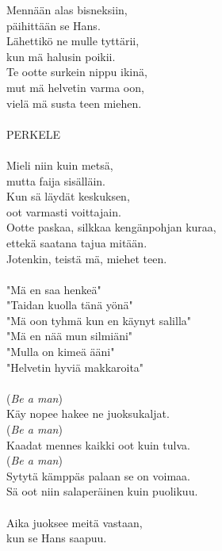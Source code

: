 
Mennään alas bisneksiin,\\
päihittään se Hans.\\
Lähettikö ne mulle tyttärii,\\
kun mä halusin poikii.\\
Te ootte surkein nippu ikinä,\\
mut mä helvetin varma oon,\\
vielä mä susta teen miehen.\\
\hspace{10mm} \\
PERKELE\\
\hspace{10mm} \\
Mieli niin kuin metsä,\\
mutta faija sisälläin.\\
Kun sä läydät keskuksen,\\
oot varmasti voittajain.\\
Ootte paskaa, silkkaa kengänpohjan kuraa,\\
ettekä saatana tajua mitään.\\
Jotenkin, teistä mä, miehet teen.\\
\hspace{10mm} \\
"Mä en saa henkeä"\\
"Taidan kuolla tänä yönä"\\
"Mä oon tyhmä kun en käynyt salilla"\\
"Mä en nää mun silmiäni"\\
"Mulla on kimeä ääni"\\
"Helvetin hyviä makkaroita"\\
\hspace{10mm} \\
(\textit{Be a man})\\ Käy nopee hakee ne juoksukaljat.\\
(\textit{Be a man})\\ Kaadat mennes kaikki oot kuin tulva.\\
(\textit{Be a man})\\ Sytytä kämppäs palaan se on voimaa.\\
Sä oot niin salaperäinen kuin puolikuu.\\
\hspace{10mm} \\
Aika juoksee meitä vastaan,\\
kun se Hans saapuu.\\
